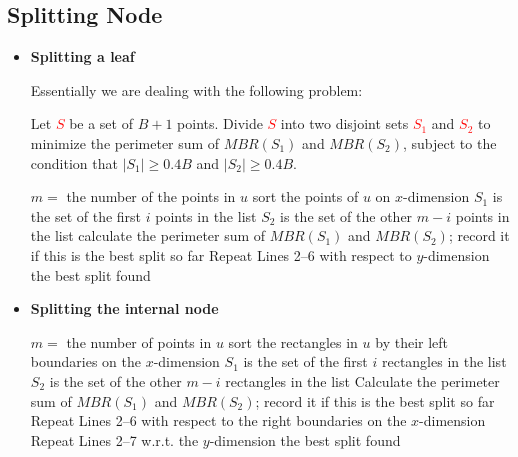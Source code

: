 \documentclass[a4paper, 10pt, titlepage]{report}
\begin{document}
\subsection{Splitting Node}
\begin{itemize}
    \item{\textbf{Splitting a leaf}}
    
    \vspace{0.2cm}
    \noindent Essentially we are dealing with the following problem:
    
    \vspace{0.2cm}
    
    \begin{tcolorbox}[
        colback=blue!5,
        colframe=blue!50!black,
        boxrule=1.5pt,
        sharp corners,
        left=10pt, right=10pt, top=10pt, bottom=10pt
    ]
    Let \textcolor{red}{$S$} be a set of $B+1$ points. Divide \textcolor{red}{$S$} into two disjoint sets \textcolor{red}{$S_1$} and \textcolor{red}{$S_2$} to minimize the perimeter sum of $MBR(S_1)$ and $MBR(S_2)$, subject to the condition that $|S_1| \geq 0.4B$ and $|S_2| \geq 0.4B$.
    \end{tcolorbox}
    \begin{algorithm}
    \caption{split $u$}
    \begin{algorithmic}[1]
        \State $m =$ the number of the points in $u$
        \State sort the points of $u$ on $x$-dimension
            \State $S_1$ is the set of the first $i$ points in the list
            \State $S_2$ is the set of the other $m - i$ points in the list
            \State calculate the perimeter sum of $MBR(S_1)$ and $MBR(S_2)$; record it if this is the best split so far
        \EndFor
        \State Repeat Lines 2--6 with respect to $y$-dimension
        \State \Return the best split found
    \EndProcedure
    \end{algorithmic}
    \end{algorithm}
    
    \item{\textbf{Splitting the internal node}}
    \begin{algorithm}[H]
    \caption{split $u$}
    \begin{algorithmic}[1]
        \State $m =$ the number of points in $u$
        \State sort the rectangles in $u$ by their left boundaries on the $x$-dimension
            \State $S_1$ is the set of the first $i$ rectangles in the list
            \State $S_2$ is the set of the other $m - i$ rectangles in the list
            \State Calculate the perimeter sum of $MBR(S_1)$ and $MBR(S_2)$; record it if this is the best split so far
        \EndFor
        \State Repeat Lines 2--6 with respect to the right boundaries on the $x$-dimension
        \State Repeat Lines 2--7 w.r.t. the $y$-dimension
        \State \Return the best split found
    \EndProcedure
    \end{algorithmic}
    \end{algorithm}
\end{itemize}
\end{document}
